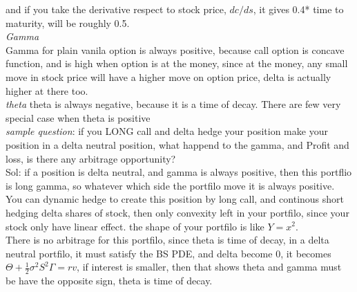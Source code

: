 \documentclass[a4paper,11pt]{article}
\begin{document}
and if you take the derivative respect to stock price, $dc/ds$, it gives 0.4* time to maturity, will be roughly 0.5.\\
{\em Gamma}\\Gamma for plain vanila option is always positive, because call option is concave function, and is high when option is at the money, since at the money, any small move in stock price will have a higher move on option price, delta is actually higher at there too. \\
{\em theta} theta is always negative, because it is a time of decay. There are few very special case when theta is positive\\
{\em sample question}: if you LONG call and delta hedge your position make your position in a delta neutral position, what happend to the gamma, and Profit and loss, is there any arbitrage opportunity?\\
Sol: if a position is delta neutral, and gamma is always positive, then this portflio is long gamma, so whatever which side the portfilo move it is always positive. You can dynamic hedge to create this position by long call, and continous short hedging delta shares of stock, then only convexity left in your portfilo, since your stock only have linear effect. the shape of your portfilo is like $Y=x^2$.\\
There is no arbitrage for this portfilo, since theta is time of decay, in a delta neutral portfilo, it must satisfy the BS PDE, and delta become 0, it becomes $\Theta+\frac{1}{2}\sigma^2S^2\Gamma=rv$, if interest is smaller, then that shows theta and gamma must be have the opposite sign, theta is time of decay.
\end{document}
